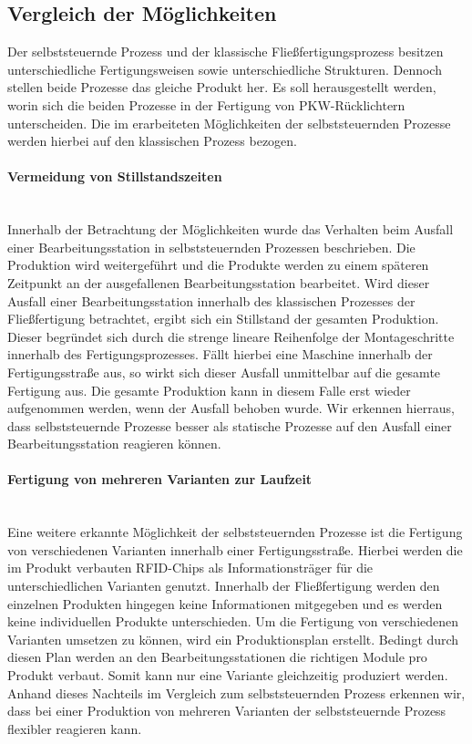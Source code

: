 \subsection{Vergleich der Möglichkeiten}
\label{sec:Vergleich_der_Moeglichkeiten}

Der selbststeuernde Prozess und der klassische Fließfertigungsprozess besitzen
unterschiedliche Fertigungsweisen sowie unterschiedliche Strukturen. Dennoch
stellen beide Prozesse das gleiche Produkt her. Es soll herausgestellt werden,
worin sich die beiden Prozesse in der Fertigung von PKW-Rücklichtern
unterscheiden. Die im  erarbeiteten Möglichkeiten der
selbststeuernden Prozesse werden hierbei auf den klassischen Prozess bezogen.

\paragraph{Vermeidung von Stillstandszeiten}\hfill \\
Innerhalb der Betrachtung der Möglichkeiten wurde das Verhalten beim Ausfall
einer Bearbeitungsstation in selbststeuernden Prozessen beschrieben. Die
Produktion wird weitergeführt und die Produkte werden zu einem späteren
Zeitpunkt an der ausgefallenen Bearbeitungsstation bearbeitet. Wird dieser
Ausfall einer Bearbeitungsstation innerhalb des klassischen Prozesses der
Fließfertigung betrachtet, ergibt sich ein Stillstand der gesamten Produktion.
Dieser begründet sich durch die strenge lineare Reihenfolge der Montageschritte
innerhalb des Fertigungsprozesses. Fällt hierbei eine Maschine innerhalb der
Fertigungsstraße aus, so wirkt sich dieser Ausfall unmittelbar auf die gesamte
Fertigung aus. Die gesamte Produktion kann in diesem Falle erst wieder
aufgenommen werden, wenn der Ausfall behoben wurde. Wir erkennen hierraus, dass
selbststeuernde Prozesse besser als statische Prozesse  auf den Ausfall einer
Bearbeitungsstation reagieren können.

\paragraph{Fertigung von mehreren Varianten zur Laufzeit} \hfill \\
Eine weitere erkannte Möglichkeit der selbststeuernden Prozesse ist die
Fertigung von verschiedenen Varianten innerhalb einer Fertigungsstraße. Hierbei
werden die im Produkt verbauten RFID-Chips als Informationsträger für die
unterschiedlichen Varianten genutzt. Innerhalb der Fließfertigung werden den
einzelnen Produkten hingegen keine Informationen mitgegeben und es werden
keine individuellen Produkte unterschieden. Um die Fertigung von verschiedenen
Varianten umsetzen zu können, wird ein Produktionsplan erstellt.
Bedingt durch diesen Plan werden an den Bearbeitungsstationen die richtigen
Module pro Produkt verbaut. Somit kann nur eine Variante gleichzeitig
produziert werden. Anhand dieses Nachteils im Vergleich zum selbststeuernden
Prozess erkennen wir, dass bei einer Produktion von mehreren Varianten der
selbststeuernde Prozess flexibler reagieren kann.



